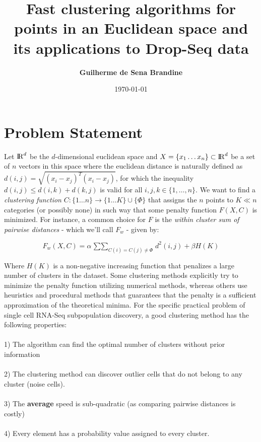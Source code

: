 \documentclass[11pt]{article}
\title{\bf Fast clustering algorithms for points in an Euclidean space and its applications to Drop-Seq data}
\author{\bf Guilherme de Sena Brandine}
\date{\today}
\begin{document}
\maketitle

\section{Problem Statement}
Let ${\rm I\!R}^d$ be the $d$-dimensional euclidean space and $X = \{x_1 \dots x_n\} \subset {\rm I\!R}^d$ be a set of $n$ vectors in this space where the euclidean distance is naturally defined as $d(i,j) = \sqrt{(x_i - x_j)^T (x_i - x_j)}$, for which the inequality $d(i,j) \leq d(i,k)+d(k,j)$ is valid for all $i,j,k \in \{1,\dots,n\}$. We want to find a \emph {clustering function} $C:\{ 1 \dots n \} \rightarrow \{1 \dots K \} \cup \{ \Phi \}$ that assigns the $n$ points to $K \ll n$ categories (or possibly none) in such way that some penalty function $F(X,C)$ is minimized. For instance, a common choice for $F$ is the \emph{within cluster sum of pairwise distances} - which we'll call $F_w$ - given by:

\begin{equation}
F_w(X,C) = \alpha \mathop{\sum \sum}_{C(i)=C(j)\neq \Phi} d^2 (i,j) + \beta H(K)
\end{equation}

Where $H(K)$ is a non-negative increasing function that penalizes a large number of clusters in the dataset. Some clustering methods explicitly try to minimize the penalty function utilizing numerical methods, whereas others use heuristics and procedural methods that guarantees that the penalty is a sufficient approximation of the theoretical minima. For the specific practical problem of single cell RNA-Seq subpopulation discovery, a good clustering method has the following properties: \\
\\
1) The algorithm can find the optimal number of clusters without prior information\\
\\
2) The clustering method can discover outlier cells that do not belong to any cluster (noise cells). \\
\\
3) The \textbf{average} speed is sub-quadratic (as comparing pairwise distances is costly)\\
\\
4) Every element has a probability value assigned to every cluster.
\end{document}

